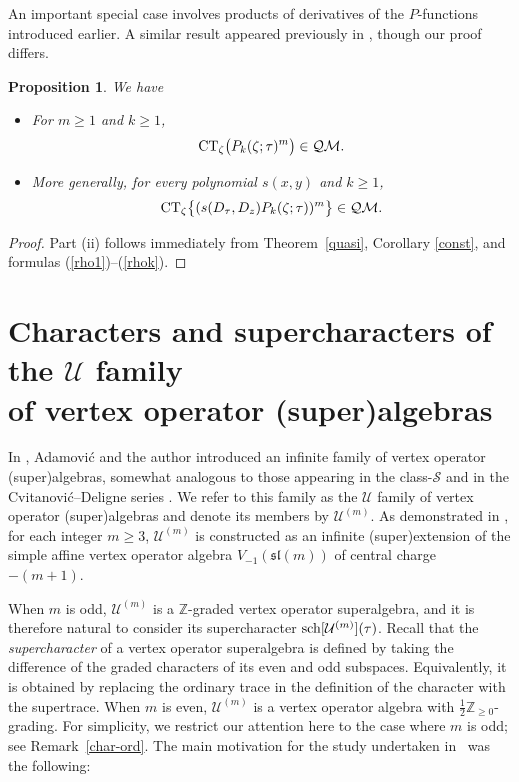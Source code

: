 \documentclass[10pt,a4paper]{amsart}
\numberwithin{equation}{section}
\newtheorem{Proposition}[Theorem]{Proposition}
\theoremstyle{definition}
\begin{document}
An important special case involves products of derivatives of the $P$-functions introduced earlier.
A similar result appeared previously in \cite[Proposition~5.9]{GM}, though our proof differs.

\begin{Proposition} \label{P-power} We have
\begin{itemize}\itemsep=0pt
\item[$(i)$] For $m \geq 1$ and $k \geq 1$,
\[
{\rm CT}_{\zeta} \bigl(P_k(\zeta;\tau)^m \bigr) \in \mathcal{QM}.
\]
\item[$(ii)$] More generally, for every polynomial $s(x,y)$ and $k \geq 1$,
\[
{\rm CT}_{\zeta} \bigl\{ (s(D_\tau,D_{z}) P_k(\zeta;\tau))^{m} \bigr\} \in \mathcal{QM}.
\]
\end{itemize}
\end{Proposition}
\begin{proof} Part (ii) follows immediately from Theorem~\ref{quasi}, Corollary \ref{const}, and formulas (\ref{rho1})--(\ref{rhok}).
\end{proof}

\section[Characters and supercharacters of the U family of vertex operator (super)algebras]{Characters and supercharacters of the $\boldsymbol{\mathcal{U}}$ family\\ of vertex operator (super)algebras}\label{section4}

In \cite{AM}, Adamovi\'c and the author introduced an infinite family of vertex operator (super)algebras, somewhat analogous to those appearing in the class-$\mathcal{S}$ and in the Cvitanovi\'c--Deligne series \cite{AK,BR}.
We refer to this family as the $\mathcal{U}$ family of vertex operator (super)algebras and denote its members by $\mathcal{U}^{(m)}$. As demonstrated in \cite{AM},
for each integer $m \geq 3$, $\mathcal{U}^{(m)}$ is constructed as an infinite (super)extension of the simple affine vertex operator algebra $V_{-1}(\mathfrak{sl}(m))$ of central charge $-(m+1)$.

When $m$ is odd, $\mathcal{U}^{(m)}$ is a $\mathbb{Z}$-graded vertex operator superalgebra, and it is therefore natural to consider its supercharacter ${\rm sch}[\mathcal{U}^{(m)}](\tau)$.
Recall that the \emph{supercharacter} of a vertex operator superalgebra is
defined by taking the difference of the graded characters of its even and odd
subspaces. Equivalently, it is obtained by replacing the ordinary trace in the
definition of the character with the supertrace.
When $m$ is even, $\mathcal{U}^{(m)}$ is a vertex operator algebra with $\tfrac{1}{2}\mathbb{Z}_{\geq 0}$-grading.
For simplicity, we restrict our attention here to the case where $m$ is odd; see Remark~\ref{char-ord}.
The main motivation for the study undertaken in~\cite{AM} was the following:
\end{document}

